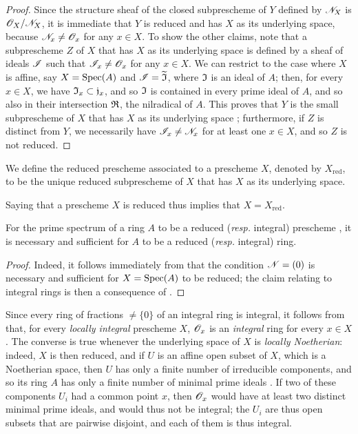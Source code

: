 \begin{proof}
\label{proof-1.5.1.2}
Since the structure sheaf of the closed subprescheme of $Y$ defined by $\mathscr{N}_X$ is $\mathscr{O}_X/\mathscr{N}_X$, it is immediate that $Y$ is reduced and has $X$ as its underlying space, because $\mathscr{N}_x\neq\mathscr{O}_x$ for any $x\in X$.
To show the other claims, note that a subprescheme $Z$ of $X$ that has $X$ as its underlying space is defined by a sheaf of ideals $\mathscr{I}$  such that $\mathscr{I}_x\neq\mathscr{O}_x$ for any $x\in X$.
We can restrict to the case where $X$ is affine, say $X={\mathop{\mathrm{Spec}}\nolimits}(A)$ and $\mathscr{I}=\widetilde{\mathfrak{I}}$, where $\mathfrak{I}$ is an ideal of $A$;
then, for every $x\in X$, we have $\mathfrak{I}_x\subset\mathfrak{j}_x$, and so $\mathfrak{I}$ is contained in every prime ideal of $A$, and so also in their intersection $\mathfrak{R}$, the nilradical of $A$.
This proves that $Y$ is the small subprescheme of $X$ that has $X$ as its underlying space ;
furthermore, if $Z$ is distinct from $Y$, we necessarily have $\mathscr{I}_x\neq\mathscr{N}_x$ for at least one $x\in X$, and so  $Z$ is not reduced.
\end{proof}

\begin{defn}[5.1.3]
\label{1.5.1.3}
We define the reduced prescheme associated to a prescheme $X$, denoted by $X_\mathrm{red}$, to be the unique reduced subprescheme of $X$ that has $X$ as its underlying space.
\end{defn}

Saying that a prescheme $X$ is reduced thus implies that $X=X_\mathrm{red}$.

\begin{prop}[5.1.4]
\label{1.5.1.4}
For the prime spectrum of a ring $A$ to be a reduced (\emph{resp.} integral) prescheme , it is necessary and sufficient for $A$ to be a reduced (\emph{resp.} integral) ring.
\end{prop}

\begin{proof}
\label{proof-1.5.1.4}
Indeed, it follows immediately from  that the condition $\mathscr{N}=(0)$ is necessary and sufficient for $X={\mathop{\mathrm{Spec}}\nolimits}(A)$ to be reduced;
the claim relating to integral rings is then a consequence of .
\end{proof}

Since every ring of fractions $\neq\{0\}$ of an integral ring is integral, it follows from  that, for every \emph{locally integral} prescheme $X$, $\mathscr{O}_x$ is an \emph{integral} ring for every $x\in X$.
The converse is true whenever the underlying space of $X$ is \emph{locally Noetherian}:
indeed, $X$ is then reduced, and if $U$ is an affine open subset of $X$, which is a Noetherian space, then $U$ has only a finite number of irreducible components, and so its ring $A$ has only a finite number of minimal prime ideals .
If two of these components $U_i$ had a common point $x$, then $\mathscr{O}_x$ would have at least two distinct minimal prime ideals, and would thus not be integral;
the $U_i$ are thus open subsets that are pairwise disjoint, and each of them is thus integral.

